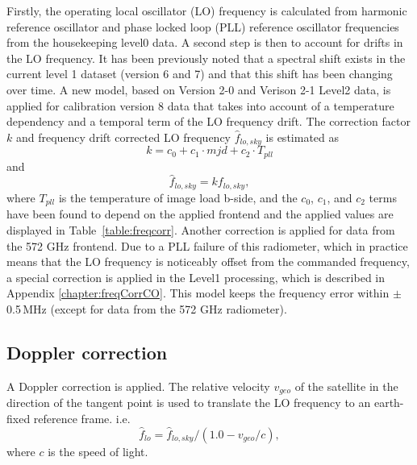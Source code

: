 Firstly, the operating local oscillator (LO) frequency is calculated
from harmonic reference oscillator and phase locked loop (PLL) 
reference oscillator frequencies from the housekeeping level0 data.
A second step is then to account for drifts in the LO frequency.
It has been previously noted that a spectral shift exists in 
the current level 1 dataset (version 6 and 7) and that this shift 
has been changing over time.
A new model, based on Version 2-0 and Verison 2-1 Level2 data,
is applied for calibration version 8 data that takes into
account of a temperature dependency and a temporal term
of the LO frequency drift.
The correction factor \(k\) and frequency drift corrected
LO frequency \(\hat{f}_{lo,sky}\) is estimated as
\begin{equation}
  \label{eq:freqcorr}
  k = c_{0} + c_{1} \cdot mjd + c_{2} \cdot T_{pll}
\end{equation}
and
\begin{equation}
 \label{eq:freqest}
 \hat{f}_{lo,sky}= k f_{lo,sky},
\end{equation}
where \(T_{pll}\) is the temperature of image load b-side,
and the \(c_{0}\), \(c_{1}\), and \(c_{2}\) terms have been found
to depend on the applied frontend and the applied values are
displayed in Table~\ref{table:freqcorr}. Another correction
is applied for data from the 572 GHz frontend. Due to a PLL
failure of this radiometer, which in practice means
that the LO frequency is noticeably offset from the commanded 
frequency, a special correction is applied in the Level1 processing, which is described in Appendix \ref{chapter:freqCorrCO}.  
This model keeps the frequency error within \(\pm\)\,0.5\,MHz
(except for data from the 572 GHz radiometer).


\subsection{Doppler correction}

A Doppler correction is applied.
The relative velocity \(v_{geo}\) of the satellite in the direction
of the tangent point is used to translate the LO frequency to an 
earth-fixed reference frame. i.e.
\begin{equation}
\hat{f}_{lo} = \hat{f}_{lo,sky}/(1.0 - v_{geo}/c),
\end{equation}
where \(c\) is the speed of light.

